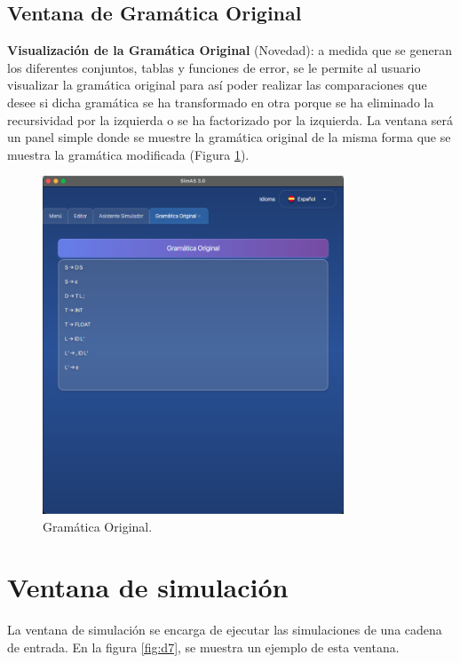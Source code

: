 \subsection{Ventana de Gramática Original}

\textbf{Visualización de la Gramática Original} (Novedad): a medida que se generan los diferentes conjuntos, tablas y funciones de error, se le permite al usuario visualizar la gramática original para así poder realizar las comparaciones que desee si dicha gramática se ha transformado en otra porque se ha eliminado la recursividad por la izquierda o se ha factorizado por la izquierda. La ventana será un panel simple donde se muestre la gramática original de la misma forma que se muestra la gramática modificada (Figura \ref{fig:d10}).

\begin{figure}[htp]
\centering
\includegraphics[width=0.8\textwidth]{figuras2/simulador/gramatica_original.png}
\caption{Gramática Original.}
\label{fig:d10}
\end{figure}

 \section{Ventana de simulación}

La ventana de simulación se encarga de ejecutar las simulaciones de una cadena de entrada. En la figura \ref{fig:d7}, se muestra un ejemplo de esta ventana.

